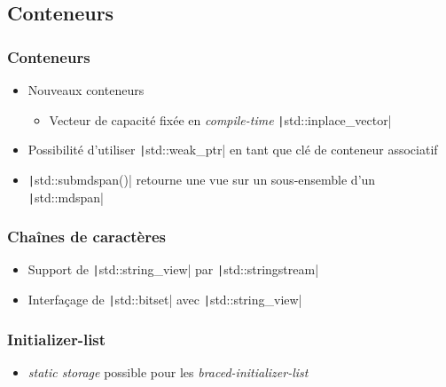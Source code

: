 \documentclass[C++.tex]{subfiles}
\begin{document}
\subsection*{Conteneurs}
\begin{frame}[fragile]
	\frametitle{Conteneurs}
	\begin{itemize}
		\item Nouveaux conteneurs
		\begin{itemize}
			\item Vecteur de capacité fixée en \textit{compile-time} \texttt|std::inplace_vector|

		\end{itemize}
		\item Possibilité d'utiliser \texttt|std::weak_ptr| en tant que clé de conteneur associatif
		\item \texttt|std::submdspan()| retourne une vue sur un sous-ensemble d'un \texttt|std::mdspan|
	\end{itemize}

\end{frame}

\begin{frame}[fragile]
	\frametitle{Chaînes de caractères}
	\begin{itemize}
		\item Support de \texttt|std::string_view| par \texttt|std::stringstream|
		\item Interfaçage de \texttt|std::bitset| avec \texttt|std::string_view|
	\end{itemize}

\end{frame}

\begin{frame}[fragile]
	\frametitle{Initializer-list}
	\begin{itemize}
		\item \textit{static storage} possible pour les \textit{braced-initializer-list}

	\end{itemize}

\end{frame}
\end{document}
